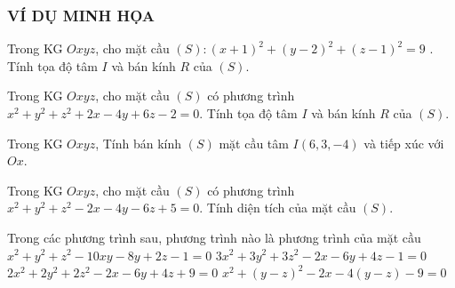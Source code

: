 \subsubsection{VÍ DỤ MINH HỌA}
\begin{vd}%
	Trong KG $Oxyz$, cho mặt cầu $(S )\colon (x+1 )^2+(y-2 )^2+(z-1 )^2=9$ . Tính tọa độ tâm $I$ và bán kính $R$ của $(S )$. 
\end{vd}
\begin{vd}%
	Trong KG $Oxyz$, cho mặt cầu $(S )$ có phương trình $x^2+y^2+z^2+2x-4y+6z-2=0$. Tính tọa độ tâm $I$ và bán kính $R$ của $(S )$.
\end{vd}
\begin{vd}%
	Trong KG $Oxyz$, Tính bán kính $(S)$ mặt cầu tâm $I(6,3,-4 )$ và tiếp xúc với $Ox$.
\end{vd}
\begin{vd}%
	Trong KG $Oxyz$, 
	cho mặt cầu $(S)$ có phương trình $x^2+y^2+z^2-2x-4y-6z+5=0$. 
	Tính diện tích của mặt cầu $(S )$.
\end{vd}
\begin{vd}%
	Trong các phương trình sau, phương trình nào là phương trình của mặt cầu
	\choice 
	{ $x^2+y^2+z^2-10xy-8y+2z-1=0$}
	{ \True $3x^2+3y^2+3z^2-2x-6y+4z-1=0$} 
	{ $2x^2+2y^2+2z^2-2x-6y+4z+9=0$}
	{ $x^2+(y-z )^2-2x-4(y-z )-9=0$} 
\end{vd}
